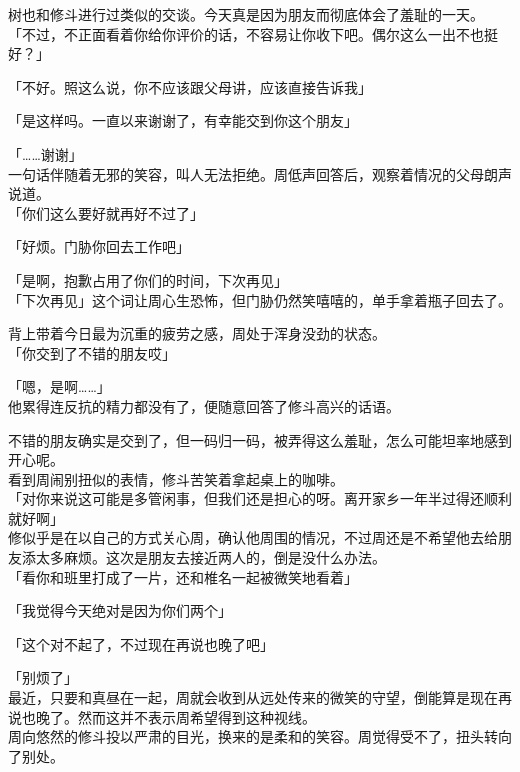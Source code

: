 树也和修斗进行过类似的交谈。今天真是因为朋友而彻底体会了羞耻的一天。\\

「不过，不正面看着你给你评价的话，不容易让你收下吧。偶尔这么一出不也挺好？」

「不好。照这么说，你不应该跟父母讲，应该直接告诉我」

「是这样吗。一直以来谢谢了，有幸能交到你这个朋友」

「……谢谢」\\

一句话伴随着无邪的笑容，叫人无法拒绝。周低声回答后，观察着情况的父母朗声说道。\\

「你们这么要好就再好不过了」

「好烦。门胁你回去工作吧」

「是啊，抱歉占用了你们的时间，下次再见」\\

「下次再见」这个词让周心生恐怖，但门胁仍然笑嘻嘻的，单手拿着瓶子回去了。

背上带着今日最为沉重的疲劳之感，周处于浑身没劲的状态。\\

「你交到了不错的朋友哎」

「嗯，是啊……」\\

他累得连反抗的精力都没有了，便随意回答了修斗高兴的话语。

不错的朋友确实是交到了，但一码归一码，被弄得这么羞耻，怎么可能坦率地感到开心呢。\\

看到周闹别扭似的表情，修斗苦笑着拿起桌上的咖啡。\\

「对你来说这可能是多管闲事，但我们还是担心的呀。离开家乡一年半过得还顺利就好啊」\\

修似乎是在以自己的方式关心周，确认他周围的情况，不过周还是不希望他去给朋友添太多麻烦。这次是朋友去接近两人的，倒是没什么办法。\\

「看你和班里打成了一片，还和椎名一起被微笑地看着」

「我觉得今天绝对是因为你们两个」

「这个对不起了，不过现在再说也晚了吧」

「别烦了」\\

最近，只要和真昼在一起，周就会收到从远处传来的微笑的守望，倒能算是现在再说也晚了。然而这并不表示周希望得到这种视线。\\

周向悠然的修斗投以严肃的目光，换来的是柔和的笑容。周觉得受不了，扭头转向了别处。
